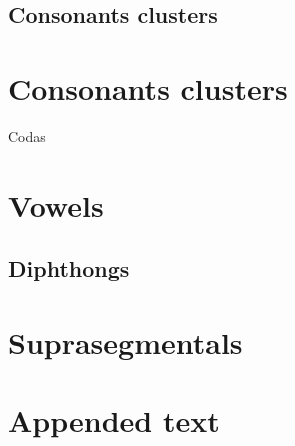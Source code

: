 \documentclass[oldfontcommands,oneside,a4paper,11pt]{article}
\begin{document}
  \subsection{Consonants clusters}
  
  \citet{japhug14ideophones}
      \section{Consonants clusters}{Codas}
    
    
     \section{Vowels}
     
          \subsection{Diphthongs}
     
     \section{Suprasegmentals}
     
         
     \section{Appended text}


\end{document}

